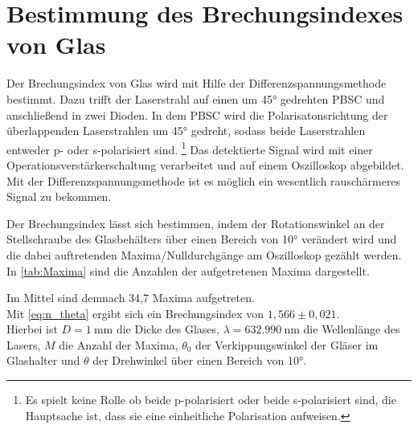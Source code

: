 \section{Bestimmung des Brechungsindexes von Glas}
Der Brechungsindex von Glas wird mit Hilfe der Differenzspannungsmethode bestimmt.
Dazu trifft der Laserstrahl auf einen um 45° gedrehten PBSC und anschließend in zwei Dioden.
In dem PBSC wird die Polarisatonsrichtung der überlappenden Laserstrahlen um 45° gedreht, sodass
beide Laserstrahlen entweder p- oder s-polarisiert sind.
\footnote{Es spielt keine Rolle ob beide p-polarisiert oder beide s-polarisiert sind, die Hauptsache ist, dass sie eine 
einheitliche Polarisation aufweisen.}
Das detektierte Signal wird mit einer Operationsverstärkerschaltung verarbeitet und auf einem
Oszilloskop abgebildet.
Mit der Differenzspannungsmethode ist es möglich ein wesentlich rauschärmeres Signal zu bekommen.

Der Brechungsindex lässt sich bestimmen, indem der Rotationswinkel an der Stellschraube des Glasbehälters %
über einen Bereich von 10° verändert wird und die dabei auftretenden Maxima/Nulldurchgänge am
Oszilloskop gezählt werden.
In \autoref{tab:Maxima} sind die Anzahlen der aufgetretenen Maxima dargestellt.

\FloatBarrier
Im Mittel sind demnach 34,7 Maxima aufgetreten.\\
Mit \autoref{eq:n_theta}
ergibt sich ein Brechungsindex von $1,566 \pm 0,021$.\\
Hierbei ist $D=\SI{1}{\milli\meter}$ die Dicke des Glases, $\lambda=\SI{632,990}{\nano\meter}$ die 
Wellenlänge des Lasers, $M$ die Anzahl der Maxima, $\theta_0$ der Verkippungswinkel der Gläser im Glashalter und
$\theta$ der Drehwinkel über einen Bereich von 10°.

